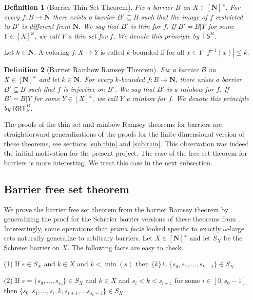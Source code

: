 \documentclass{amsart}
\theoremstyle{plain}
\theoremstyle{plain}
\newtheorem*{definition}{Definition}
\newcommand{\om}{\omega}
\newcommand\Nat{\mathbf{N}}
\newcommand\TS{\mathsf{TS}}
\newcommand\RRT{\mathsf{RRT}}
\begin{document}
\begin{definition}[Barrier Thin Set Theorem]
Fix a barrier $B$ on $X\in [\Nat]^\omega$. For every $f:B \to \Nat$ there exists a barrier $B'\subseteq B$ such that the image of $f$ restricted to $B'$ is different from $\Nat$. We say that $B'$ is thin for $f$. If $B'=B\vert Y$ for some $Y\in [X]^\om$, we call $Y$ a thin set for $f$.
We denote this principle by $\TS^B$. 
\end{definition}

Let $k\in\Nat$. A coloring $f:X \to Y$ is called $k$-bounded if for
all $x \in Y$ $|f^{-1}(x)|\leq k$.

\begin{definition}[Barrier Rainbow Ramsey Theorem]
Fix a barrier $B$ on $X\in [\Nat]^\omega$ and let $k\in \Nat$.  
For every $k$-bounded $f:B \to \Nat$, there exists a barrier $B' \subseteq B$ such that $f$ is injective on $B'$. We say that $B'$ is a rainbow for $f$. If $B'=B\vert Y$ for some $Y\in [X]^\om$, we call $Y$ a rainbow for $f$. We denote this principle by $\RRT^B_k$.
\end{definition}

The proofs of the thin set and rainbow Ramsey theorems for barriers are straightforward generalizations of the proofs for the finite dimensional version of these theorems, see sections \ref{sub:thin} and \ref{sub:rain}. This observation was indeed the initial motivation for the present project. The case of the free set theorem for barriers is more interesting. We treat this case in the next subsection.

\subsection{Barrier free set theorem}\label{sub:free}

We prove the barrier free set theorem from the barrier Ramsey theorem by generalizing the proof for the Schreier barrier versions of these theorems from \cite{carlucci2024ramseyliketheoremsschreierbarrier}.
Interestingly, some operations that {\em prima facie} looked specific to exactly $\om$-large sets naturally generalize to arbitrary barriers. Let $X \in [\Nat]^\om$ and let $S_X$ be the Schreier barrier on $X$. The following facts are easy to check. 

(1) If $s \in S_X$ and $k \in X$ and $k < \min(s)$
then $\{ k\} \cup \{ s_0, s_1, \dots, s_{k-1}\} \in S_X$.

(2) If $s = \{s_0, \dots, s_{s_0}\} \in S_X$ and $k \in X$ and $s_i < k < s_{i+1}$ for some $i \in [0, s_0-1]$ then $\{ s_0, s_1, \dots, s_{i}, k, s_{i+1}, \dots s_{s_0-1}\} \in S_X$. 
\end{document}
